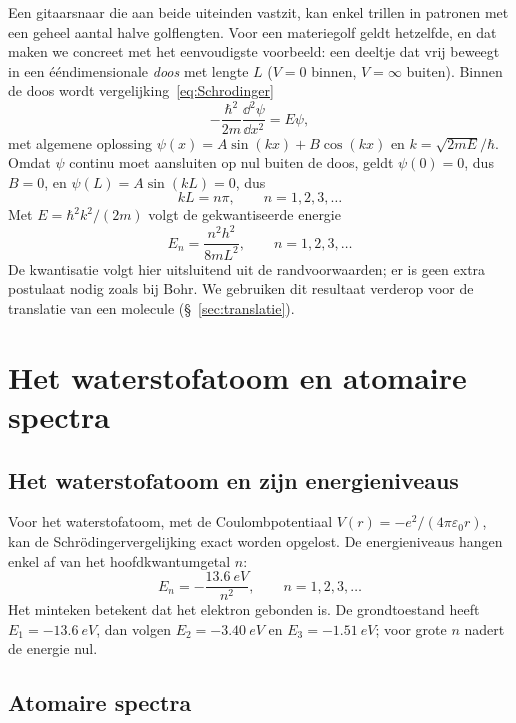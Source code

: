 Een gitaarsnaar die aan beide uiteinden vastzit, kan enkel trillen in patronen met een geheel aantal halve golflengten. Voor een materiegolf geldt hetzelfde, en dat maken we concreet met het eenvoudigste voorbeeld: een deeltje dat vrij beweegt in een ééndimensionale \emph{doos} met lengte $L$ ($V=0$ binnen, $V=\infty$ buiten). Binnen de doos wordt vergelijking~\eqref{eq:Schrodinger}
\[
-\frac{\hbar^2}{2m}\frac{\dd^2\psi}{\dd x^2} = E\psi,
\]
met algemene oplossing $\psi(x)=A\sin(kx)+B\cos(kx)$ en $k=\sqrt{2mE}/\hbar$. Omdat $\psi$ continu moet aansluiten op nul buiten de doos, geldt $\psi(0)=0$, dus $B=0$, en $\psi(L)=A\sin(kL)=0$, dus
\[
kL = n\pi, \qquad n=1,2,3,\ldots
\]
Met $E=\hbar^2k^2/(2m)$ volgt de gekwantiseerde energie
\begin{equation}
E_n = \frac{n^2h^2}{8mL^2}, \qquad n=1,2,3,\ldots
\label{eq:deeltje-in-doos}
\end{equation}
De kwantisatie volgt hier uitsluitend uit de randvoorwaarden; er is geen extra postulaat nodig zoals bij Bohr. We gebruiken dit resultaat verderop voor de translatie van een molecule (\S~\ref{sec:translatie}).

\section{Het waterstofatoom en atomaire spectra}

\subsection{Het waterstofatoom en zijn energieniveaus}
\label{sec:waterstofatoom}

Voor het waterstofatoom, met de Coulombpotentiaal $V(r)= -e^2/(4\pi\varepsilon_0 r)$, kan de Schr\"odingervergelijking exact worden opgelost. De energieniveaus hangen enkel af van het hoofdkwantumgetal $n$:
\begin{equation}
E_n = -\frac{\SI{13.6}{eV}}{n^2}, \qquad n = 1,2,3,\ldots
\end{equation}
Het minteken betekent dat het elektron gebonden is. De grondtoestand heeft $E_1 = \SI{-13.6}{eV}$, dan volgen $E_2 = \SI{-3.40}{eV}$ en $E_3 = \SI{-1.51}{eV}$; voor grote $n$ nadert de energie nul.

\subsection{Atomaire spectra}
\label{sec:atomaire-spectra}

